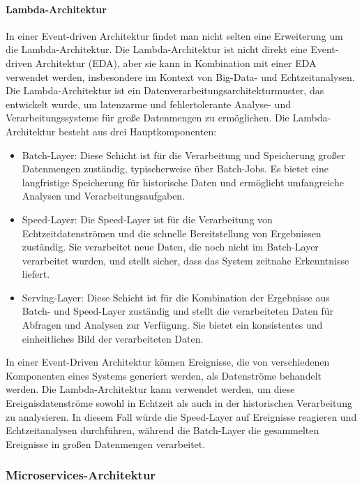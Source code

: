 \documentclass[../vs-script-first-v01.tex]{subfiles}
\begin{document}
\paragraph{Lambda-Architektur}
In einer Event-driven Architektur findet man nicht selten eine Erweiterung um die Lambda-Architektur.
Die Lambda-Architektur ist nicht direkt eine Event-driven Architektur (EDA), aber sie kann in Kombination mit einer EDA verwendet werden, insbesondere im Kontext von Big-Data- und Echtzeitanalysen. Die Lambda-Architektur ist ein Datenverarbeitungsarchitekturmuster, das entwickelt wurde, um latenzarme und fehlertolerante Analyse- und Verarbeitungssysteme für große Datenmengen zu ermöglichen. Die Lambda-Architektur besteht aus drei Hauptkomponenten:
\begin{itemize}
\item Batch-Layer: Diese Schicht ist für die Verarbeitung und Speicherung großer Datenmengen zuständig, typischerweise über Batch-Jobs. Es bietet eine langfristige Speicherung für historische Daten und ermöglicht umfangreiche Analysen und Verarbeitungsaufgaben.

\item Speed-Layer: Die Speed-Layer ist für die Verarbeitung von Echtzeitdatenströmen und die schnelle Bereitstellung von Ergebnissen zuständig. Sie verarbeitet neue Daten, die noch nicht im Batch-Layer verarbeitet wurden, und stellt sicher, dass das System zeitnahe Erkenntnisse liefert.

\item Serving-Layer: Diese Schicht ist für die Kombination der Ergebnisse aus Batch- und Speed-Layer zuständig und stellt die verarbeiteten Daten für Abfragen und Analysen zur Verfügung. Sie bietet ein konsistentes und einheitliches Bild der verarbeiteten Daten.
\end{itemize}
In einer Event-Driven Architektur können Ereignisse, die von verschiedenen Komponenten eines Systems generiert werden, als Datenströme behandelt werden. Die Lambda-Architektur kann verwendet werden, um diese Ereignisdatenströme sowohl in Echtzeit als auch in der historischen Verarbeitung zu analysieren. In diesem Fall würde die Speed-Layer auf Ereignisse reagieren und Echtzeitanalysen durchführen, während die Batch-Layer die gesammelten Ereignisse in großen Datenmengen verarbeitet.

\subsubsection{Microservices-Architektur}
\end{document}
